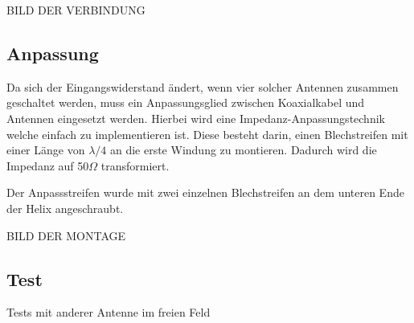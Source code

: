 BILD DER VERBINDUNG

\subsection{Anpassung}
Da sich der Eingangswiderstand ändert, wenn vier solcher Antennen zusammen geschaltet werden, muss ein Anpassungsglied zwischen Koaxialkabel und Antennen eingesetzt werden. Hierbei wird eine Impedanz-Anpassungstechnik welche einfach zu implementieren ist. Diese besteht darin, einen Blechstreifen mit einer Länge von $\lambda/4$ an die erste Windung zu montieren. Dadurch wird die Impedanz auf 50$\Omega$ transformiert.

Der Anpassstreifen wurde mit zwei einzelnen Blechstreifen an dem unteren Ende der Helix angeschraubt.

BILD DER MONTAGE

\subsection{Test}

Tests mit anderer Antenne im freien Feld